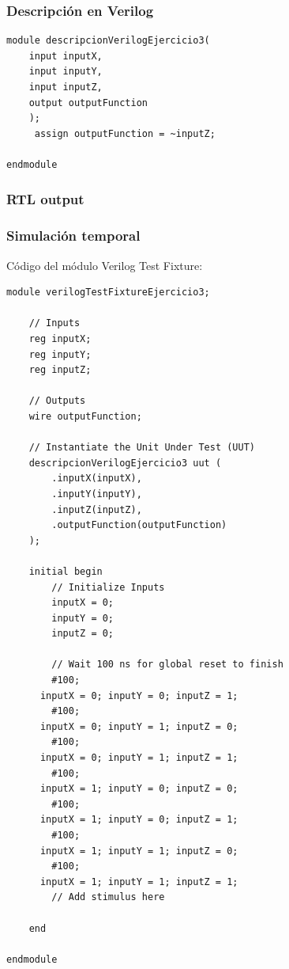 \subsubsection{Descripción en Verilog}
\begin{lstlisting}
module descripcionVerilogEjercicio3(
    input inputX,
    input inputY,
    input inputZ,
    output outputFunction
    );
	 assign outputFunction = ~inputZ;

endmodule
\end{lstlisting}
\subsubsection{RTL output}

\subsubsection{Simulación temporal}
\noindent Código del módulo Verilog Test Fixture:
\begin{lstlisting}
module verilogTestFixtureEjercicio3;

	// Inputs
	reg inputX;
	reg inputY;
	reg inputZ;

	// Outputs
	wire outputFunction;

	// Instantiate the Unit Under Test (UUT)
	descripcionVerilogEjercicio3 uut (
		.inputX(inputX), 
		.inputY(inputY), 
		.inputZ(inputZ), 
		.outputFunction(outputFunction)
	);

	initial begin
		// Initialize Inputs
		inputX = 0;
		inputY = 0;
		inputZ = 0;

		// Wait 100 ns for global reset to finish
		#100;
      inputX = 0; inputY = 0; inputZ = 1;
		#100;
      inputX = 0; inputY = 1; inputZ = 0;
		#100;
      inputX = 0; inputY = 1; inputZ = 1;
		#100;
      inputX = 1; inputY = 0; inputZ = 0;
		#100;
      inputX = 1; inputY = 0; inputZ = 1;
		#100;
      inputX = 1; inputY = 1; inputZ = 0;
		#100;
      inputX = 1; inputY = 1; inputZ = 1;		
		// Add stimulus here

	end
      
endmodule
\end{lstlisting}
